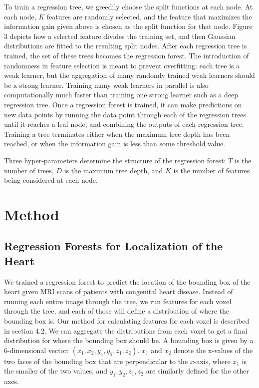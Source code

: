 To train a regression tree, we greedily choose the split functions at each node. At each node, $K$ features are randomly selected, and the feature that maximizes the information gain given above is chosen as the split function for that node. Figure 3 depicts how a selected feature divides the training set, and then Gaussian distributions are fitted to the resulting split nodes. After each regression tree is trained, the set of these trees becomes the regression forest. The introduction of randomness in feature selection is meant to prevent overfitting: each tree is a weak learner, but the aggregation of many randomly trained weak learners should be a strong learner. Training many weak learners in parallel is also computationally much faster than training one strong learner such as a deep regression tree. Once a regression forest is trained, it can make predictions on new data points by running the data point through each of the regression trees until it reaches a leaf node, and combining the outputs of each regression tree. Training a tree terminates either when the maximum tree depth has been reached, or when the information gain is less than some threshold value.

Three hyper-parameters determine the structure of the regression forest: $T$ is the number of trees, $D$ is the maximum tree depth, and $K$ is the number of features being considered at each node.

\section{Method}
\subsection{Regression Forests for Localization of the Heart}
We trained a regression forest to predict the location of the bounding box of the heart given MRI scans of patients with congenital heart disease. Instead of running each entire image through the tree, we run features for each voxel through the tree, and each of those will define a distribution of where the bounding box is. Our method for calculating features for each voxel is described in section 4.2. We can aggregate the distributions from each voxel to get a final distribution for where the bounding box should be. A bounding box is given by a 6-dimensional vector: $(x_1, x_2, y_1, y_2, z_1, z_2)$. $x_1$ and $x_2$ denote the x-values of the two faces of the bounding box that are perpendicular to the $x$-axis, where $x_1$ is the smaller of the two values, and $y_1, y_2, z_1, z_2$ are similarly defined for the other axes.

